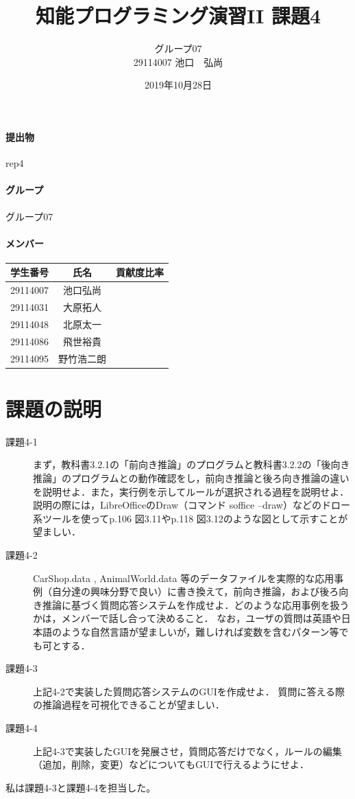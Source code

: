 \documentclass{jarticle}
\title{知能プログラミング演習II 課題4}
\author{グループ07\\
  29114007 池口　弘尚\\
}
\date{2019年10月28日}
\begin{document}
\maketitle

\paragraph{提出物} rep4
\paragraph{グループ} グループ07
\paragraph{メンバー}
\begin{tabular}{|c|c|c|}
  \hline
  学生番号&氏名&貢献度比率\\
  \hline\hline
  29114007&池口弘尚&\\
  \hline
  29114031&大原拓人&\\
  \hline
  29114048&北原太一&\\
  \hline
  29114086&飛世裕貴&\\
  \hline
  29114095&野竹浩二朗&\\
\end{tabular}

\section{課題の説明}
\begin{description}
\item[課題4-1] まず，教科書3.2.1の「前向き推論」のプログラムと教科書3.2.2の「後向き推論」のプログラムとの動作確認をし，前向き推論と後ろ向き推論の違いを説明せよ．また，実行例を示してルールが選択される過程を説明せよ．説明の際には，LibreOfficeのDraw（コマンド soffice --draw）などのドロー系ツールを使ってp.106 図3.11やp.118 図3.12のような図として示すことが望ましい．
\item[課題4-2] CarShop.data , AnimalWorld.data 等のデータファイルを実際的な応用事例（自分達の興味分野で良い）に書き換えて，前向き推論，および後ろ向き推論に基づく質問応答システムを作成せよ．どのような応用事例を扱うかは，メンバーで話し合って決めること．
 なお，ユーザの質問は英語や日本語のような自然言語が望ましいが，難しければ変数を含むパターン等でも可とする．
\item[課題4-3] 上記4-2で実装した質問応答システムのGUIを作成せよ．
 質問に答える際の推論過程を可視化できることが望ましい．
\item[課題4-4]上記4-3で実装したGUIを発展させ，質問応答だけでなく，ルールの編集（追加，削除，変更）などについてもGUIで行えるようにせよ．
\end{description}
私は課題4-3と課題4-4を担当した。
\end{document}
